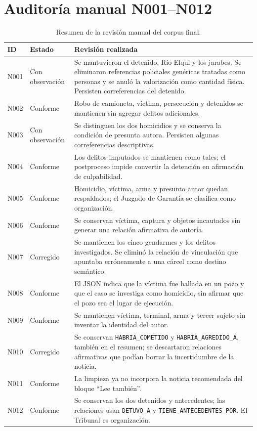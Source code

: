 \documentclass[conference]{IEEEtran}
\begin{document}
\section{Auditoría manual N001--N012}
\begin{table}[!t]
\centering
\caption{Resumen de la revisión manual del corpus final.}
\label{tab:audit}
\footnotesize
\begin{tabular}{@{}p{}p{}p{}@{}}
\toprule
\textbf{ID} & \textbf{Estado} & \textbf{Revisión realizada} \\
\midrule
N001 & Con observación & Se mantuvieron el detenido, Río Elqui y los jarabes. Se eliminaron referencias policiales genéricas tratadas como personas y se anuló la valorización como cantidad física. Persisten correferencias del detenido. \\
N002 & Conforme & Robo de camioneta, víctima, persecución y detenidos se mantienen sin agregar delitos adicionales. \\
N003 & Con observación & Se distinguen los dos homicidios y se conserva la condición de presunta autora. Persisten algunas correferencias descriptivas. \\
N004 & Conforme & Los delitos imputados se mantienen como tales; el postproceso impide convertir la detención en afirmación de culpabilidad. \\
N005 & Conforme & Homicidio, víctima, arma y presunto autor quedan respaldados; el Juzgado de Garantía se clasifica como organización. \\
N006 & Conforme & Se conservan víctima, captura y objetos incautados sin generar una relación afirmativa de autoría. \\
N007 & Corregido & Se mantienen los cinco gendarmes y los delitos investigados. Se eliminó la relación de vinculación que apuntaba erróneamente a una cárcel como destino semántico. \\
N008 & Conforme & El JSON indica que la víctima fue hallada en un pozo y que el caso se investiga como homicidio, sin afirmar que el pozo sea el lugar de ejecución. \\
N009 & Conforme & Se mantienen víctima, terminal, arma y tercer sujeto sin inventar la identidad del autor. \\
N010 & Corregido & Se conservan \texttt{HABRIA\_COMETIDO} y \texttt{HABRIA\_AGREDIDO\_A}, también en el resumen; se descartaron relaciones afirmativas que podían borrar la incertidumbre de la noticia. \\
N011 & Conforme & La limpieza ya no incorpora la noticia recomendada del bloque ``Lee también''. \\
N012 & Conforme & Se conservan los dos detenidos y antecedentes; las relaciones usan \texttt{DETUVO\_A} y \texttt{TIENE\_ANTECEDENTES\_POR}. El Tribunal es organización. \\
\bottomrule
\end{tabular}
\end{table}
\end{document}
